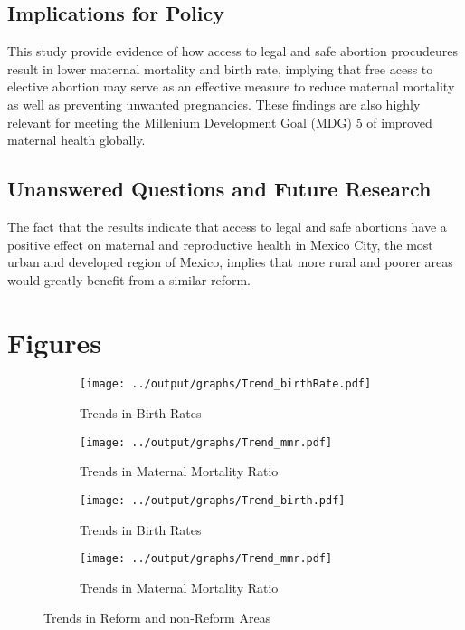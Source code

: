\documentclass[a4paper, 11pt]{article}
\begin{document}
\begin{spacing}{1.5}
\begin{multicols}{2}
\subsection{Implications for Policy}
This study provide evidence of how access to legal and safe abortion procudeures result in lower maternal mortality and birth rate, implying that free acess to elective abortion may serve as an effective measure to reduce maternal mortality as well as preventing unwanted pregnancies. These findings are also highly relevant for meeting the Millenium Development Goal (MDG) 5 of improved maternal health globally.        
\subsection{Unanswered Questions and Future Research}      	    
The fact that the results indicate that access to legal and safe abortions have a positive effect on maternal and reproductive health in Mexico City, the most urban and developed region of Mexico, implies that more rural and poorer areas would greatly benefit from a similar reform.   
 \newpage
 
 
\end{multicols} 	
\section*{Figures}
\begin{figure}[htpb!]
	\centering
	\begin{subfigure}{.5\textwidth}
		\centering
		\texttt{[image: ../output/graphs/Trend\_birthRate.pdf]}
		\caption{Trends in Birth Rates}
		\label{birthTrend}
	\end{subfigure}%
	\begin{subfigure}{.5\textwidth}
		\centering
		\texttt{[image: ../output/graphs/Trend\_mmr.pdf]}
		\caption{Trends in Maternal Mortality Ratio}
		\label{mmrTrend}
	\end{subfigure}
	
	\begin{subfigure}{.5\textwidth}
		\centering
		\texttt{[image: ../output/graphs/Trend\_birth.pdf]}
		\caption{Trends in Birth Rates}
		\label{ }
	\end{subfigure}%
	\begin{subfigure}{.5\textwidth}
		\centering
		\texttt{[image: ../output/graphs/Trend\_mmr.pdf]}
		\caption{Trends in Maternal Mortality Ratio}
		\label{ }
	\end{subfigure}
	\caption{Trends in Reform and non-Reform Areas}
	\label{ }
\end{figure}


\end{spacing}
\end{document}
